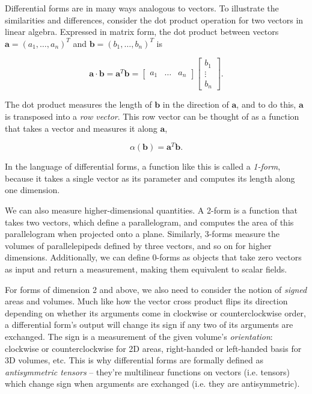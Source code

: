 \documentclass[utf8,english]{gradu3}
\begin{document}
Differential forms are in many ways analogous to vectors.
To illustrate the similarities and differences,
consider the dot product operation
for two vectors in linear algebra.
Expressed in matrix form, the dot product between vectors
$\mathbf{a} = (a_1, \dots, a_n)^T$ and $\mathbf{b} = (b_1, \dots, b_n)^T$
is

\[
  \mathbf{a} \cdot \mathbf{b} = \mathbf{a}^T \mathbf{b}
  = \begin{bmatrix}
    a_1 & \dots & a_n
  \end{bmatrix}
  \begin{bmatrix}
    b_1 \\ \vdots \\ b_n
  \end{bmatrix}.
\]

The dot product measures the length of $\mathbf{b}$ in the direction of $\mathbf{a}$,
and to do this, $\mathbf{a}$ is transposed into a \textit{row vector}.
This row vector can be thought of as a function
that takes a vector and measures it along $\mathbf{a}$,

\[
  \alpha(\mathbf{b}) = \mathbf{a}^T \mathbf{b}.
\]

In the language of differential forms,
a function like this is called a \textit{1-form},
because it takes a single vector as its parameter
and computes its length along one dimension.

We can also measure higher-dimensional quantities.
A 2-form is a function that takes two vectors,
which define a parallelogram,
and computes the area of this parallelogram
when projected onto a plane.
Similarly, 3-forms measure the volumes of parallelepipeds
defined by three vectors, and so on for higher dimensions.
Additionally, we can define 0-forms
as objects that take zero vectors as input and return a measurement,
making them equivalent to scalar fields.

For forms of dimension 2 and above, we also need to consider
the notion of \textit{signed} areas and volumes.
Much like how the vector cross product flips its direction
depending on whether its arguments come in clockwise or counterclockwise order,
a differential form's output will change its sign
if any two of its arguments are exchanged.
The sign is a measurement of the given volume's \textit{orientation}:
clockwise or counterclockwise for 2D areas,
right-handed or left-handed basis for 3D volumes, etc.
This is why differential forms are formally defined as \textit{antisymmetric tensors}
-- they're multilinear functions on vectors (i.e. tensors)
which change sign when arguments are exchanged (i.e. they are antisymmetric).
\end{document}
